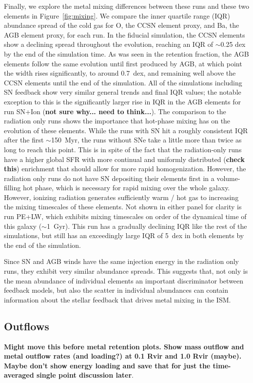\documentclass[twocolumn]{aastex62}
\begin{document}
Finally, we explore the metal mixing differences between these runs and these two elements in Figure~\ref{fig:mixing}. We compare the inner quartile range (IQR) abundance spread of the cold gas for O, the CCSN element proxy, and Ba, the AGB element proxy, for each run. In the fiducial simulation, the CCSN elements show a declining spread throughout the evolution, reaching an IQR of $\sim$0.25 dex by the end of the simulation time. As was seen in the retention fraction, the AGB elements follow the same evolution until first produced by AGB, at which point the width rises significantly, to around 0.7~dex, and remaining well above the CCSN elements until the end of the simulation. All of the simulations including SN feedback show very similar general trends and final IQR values; the notable exception to this is the significantly larger rise in IQR in the AGB elements for run SN+Ion (\textbf{not sure why... need to think...}). The comparison to the radiation only runs shows the importance that hot-phase mixing has on the evolution of these elements. While the runs with SN hit a roughly consistent IQR after the first $\sim$150~Myr, the runs without SNe take a little more than twice as long to reach this point. This is in spite of the fact that the radiation-only runs have a higher global SFR with more continual and uniformly distributed (\textbf{check this}) enrichment that should allow for more rapid homogenization. However, the radiation only runs do not have SN depositing their elements first in a volume-filling hot phase, which is necessary for rapid mixing over the whole galaxy. However, ionizing radiation generates sufficiently warm / hot gas to increasing the mixing timescales of these elements. Not shown in either panel for clarity is run PE+LW, which exhibits mixing timescales on order of the dynamical time of this galaxy ($\sim$1~Gyr). This run has a gradually declining IQR like the rest of the simulations, but still has an exceedingly large IQR of 5~dex in both elements by the end of the simulation.

Since SN and AGB winds have the same injection energy in the radiation only runs, they exhibit very similar abundance spreads. This suggests that, not only is the mean abundance of individual elements an important discriminator between feedback models, but also the scatter in individual abundances can contain information about the stellar feedback that drives metal mixing in the ISM.

\subsection{Outflows}
\textbf{Might move this before metal retention plots. Show mass outflow and metal outflow rates (and loading?) at 0.1 Rvir and 1.0 Rvir (maybe). Maybe don't show energy loading and save that for just the time-averaged single point discussion later}. 
\end{document}
